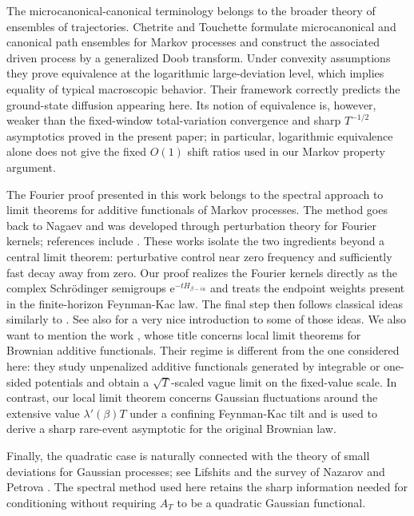 \documentclass[11pt,reqno]{amsart}
\theoremstyle{definition}
\numberwithin{equation}{section}
\newcommand{\<}{\langle}
\renewcommand{\>}{\rangle}
\begin{document}
The microcanonical-canonical terminology belongs to the broader theory of
ensembles of trajectories.  Chetrite and Touchette
\cite{ChetriteTouchettePRL,ChetriteTouchetteAHP} formulate microcanonical and
canonical path ensembles for Markov processes and construct the associated
driven process by a generalized Doob transform.  Under convexity assumptions
they prove equivalence at the logarithmic large-deviation level, which implies
equality of typical macroscopic behavior.  Their framework correctly predicts
the ground-state diffusion appearing here.  Its notion of equivalence is,
however, weaker than the fixed-window total-variation convergence and sharp
$T^{-1/2}$ asymptotics proved in the present paper; in particular,
logarithmic equivalence alone does not give the fixed $O(1)$ shift ratios used
in our Markov property argument.

The Fourier proof presented in this work belongs to the spectral approach to limit theorems for
additive functionals of Markov processes.  The method goes back to Nagaev and
was developed through perturbation theory for Fourier kernels; 
references include \cite{HennionHerve,HervePene,FerreHerveLedoux}.
These works isolate the two ingredients beyond a
central limit theorem: perturbative control near zero frequency and sufficiently fast decay away from zero.  Our proof realizes the
Fourier kernels directly as the complex Schr\"odinger semigroups
$\mathrm e^{-tH_{\beta-iu}}$ and treats the endpoint weights present in the
finite-horizon Feynman-Kac law.  The final step then follows classical ideas similarly to \cite{StoneLLT,StoneRatio}. See also \cite{vershynin2026friendly} for a very nice introduction to some of those ideas.
We also want to mention the work \cite{RoynetteYorLLT}, whose title concerns
local limit theorems for Brownian additive functionals.  Their regime is
different from the one considered here: they study unpenalized additive
functionals generated by integrable or one-sided potentials and obtain a
$\sqrt T$-scaled vague limit on the fixed-value scale.  In contrast, our local
limit theorem concerns Gaussian fluctuations around the extensive value
$\lambda'(\beta)T$ under a confining Feynman-Kac tilt and is used to derive a
sharp rare-event asymptotic for the original Brownian law.

Finally, the quadratic case is naturally connected with the theory of small
deviations for Gaussian processes; see Lifshits \cite{Lif} and
the survey of Nazarov and Petrova \cite{NazarovPetrova}.  The spectral method
used here retains the sharp information needed for conditioning without
requiring $A_T$ to be a quadratic Gaussian functional.
\end{document}
